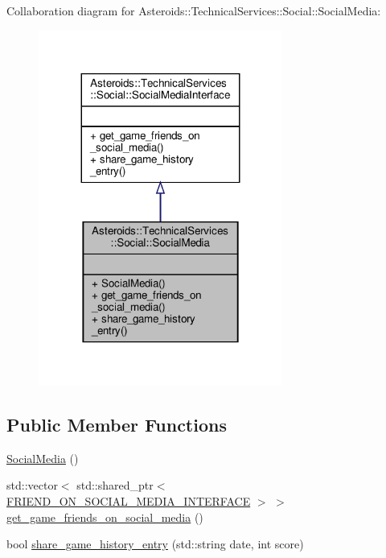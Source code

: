 Collaboration diagram for Asteroids\+:\+:Technical\+Services\+:\+:Social\+:\+:Social\+Media\+:
\nopagebreak
\begin{figure}[H]
\begin{center}
\leavevmode
\includegraphics[width=227pt]{classAsteroids_1_1TechnicalServices_1_1Social_1_1SocialMedia__coll__graph}
\end{center}
\end{figure}
\subsection*{Public Member Functions}
\begin{DoxyCompactItemize}
\item 
\hyperlink{classAsteroids_1_1TechnicalServices_1_1Social_1_1SocialMedia_a2e70711f5c7b5a977933684353d60c81}{Social\+Media} ()
\item 
std\+::vector$<$ std\+::shared\+\_\+ptr$<$ \hyperlink{classAsteroids_1_1TechnicalServices_1_1Social_1_1FRIEND__ON__SOCIAL__MEDIA__INTERFACE}{F\+R\+I\+E\+N\+D\+\_\+\+O\+N\+\_\+\+S\+O\+C\+I\+A\+L\+\_\+\+M\+E\+D\+I\+A\+\_\+\+I\+N\+T\+E\+R\+F\+A\+CE} $>$ $>$ \hyperlink{classAsteroids_1_1TechnicalServices_1_1Social_1_1SocialMedia_a548915dbbce2621bfb6272c36f41d2c3}{get\+\_\+game\+\_\+friends\+\_\+on\+\_\+social\+\_\+media} ()
\item 
bool \hyperlink{classAsteroids_1_1TechnicalServices_1_1Social_1_1SocialMedia_a0e9a33f41160db444c951015be441588}{share\+\_\+game\+\_\+history\+\_\+entry} (std\+::string date, int score)
\end{DoxyCompactItemize}


